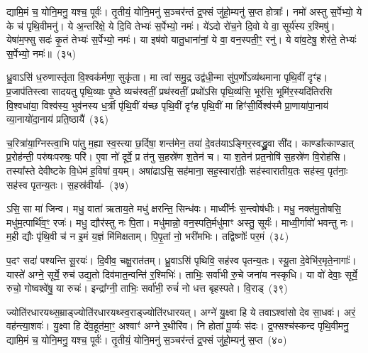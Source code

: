 द्यामि॒मं च॒ योनि॒मनु॒ यश्च॒ पूर्वः॑। तृ॒तीयं॒ योनि॒मनु॑ स॒ञ्चर॑न्तं द्र॒फ्सं जु॑हो॒म्यनु॑ स॒प्त होत्राः᳚। नमो॑ अस्तु स॒र्पेभ्यो॒ ये के च॑ पृथि॒वीमनु॑। ये अ॒न्तरि॑क्षे॒ ये दि॒वि तेभ्यः॑ स॒र्पेभ्यो॒ नमः॑। ये॑\-ऽदो रो॑च॒ने दि॒वो ये वा॒ सूर्य॑स्य र॒श्मिषु॑। येषा॑म॒फ्सु सदः॑ कृ॒तं तेभ्यः॑ स॒र्पेभ्यो॒ नमः॑। या इष॑वो यातु॒धाना॑नां॒ ये वा॒ वन॒स्पती॒ꣳ॒ रनु॑। ये वा॑व॒टेषु॒ शेर॑ते॒ तेभ्यः॑ स॒र्पेभ्यो॒ नमः॑॥~(३५)

{\anuvakamend[{म॒हो\-ऽनु॑ यातु॒धाना॑ना॒मेका॑\-दश च}]}%

ध्रु॒वाऽसि॑ ध॒रुणास्तृ॑ता वि॒श्वक॑र्मणा॒ सुकृ॑ता। मा त्वा॑ समु॒द्र उद्व॑धी॒न्मा सु॑प॒र्णो\-ऽव्य॑थमाना पृथि॒वीं दृꣳ॑ह। प्र॒जा\-प॑तिस्त्वा सादयतु पृथि॒व्याः पृ॒ष्ठे व्यच॑स्वतीं॒ प्रथ॑स्वतीं॒ प्रथो॑\-ऽसि पृथि॒व्य॑सि॒ भूर॑सि॒ भूमि॑र॒स्यदि॑तिरसि वि॒श्वधा॑या॒ विश्व॑स्य॒ भुव॑नस्य ध॒र्त्री पृ॑थि॒वीं य॑च्छ पृथि॒वीं दृꣳ॑ह पृथि॒वीं मा हिꣳ॑सी॒र्विश्व॑स्मै प्रा॒णाया॑पा॒नाय॑ व्या॒नायो॑दा॒नाय॑ प्रति॒ष्ठायै॑~(३६)

च॒रित्रा॑या॒ग्निस्त्वा॒भि पा॑तु म॒ह्या स्व॒स्त्या छ॒र्दिषा॒ शन्त॑मेन॒ तया॑ दे॒वत॑या\-ऽ\-ङ्गिर॒स्वद्ध्रु॒वा सी॑द। काण्डा᳚त्काण्डात् प्र॒रोह॑न्ती॒ परु॑षःपरुषः॒ परि॑। ए॒वा नो॑ दूर्वे॒ प्र त॑नु स॒हस्रे॑ण श॒तेन॑ च। या श॒तेन॑ प्रत॒नोषि॑ स॒हस्रे॑ण वि॒रोह॑सि। तस्या᳚स्ते देवीष्टके वि॒धेम॑ ह॒विषा॑ व॒यम्। अषा॑ढाऽसि॒ सह॑माना॒ सह॒स्वारा॑तीः॒ सह॑स्वारातीय॒तः सह॑स्व॒ पृत॑नाः॒ सह॑स्व पृतन्य॒तः। स॒हस्र॑वीर्या-~(३७)

ऽसि॒ सा मा॑ जिन्व। मधु॒ वाता॑ ऋताय॒ते मधु॑ क्षरन्ति॒ सिन्ध॑वः। माध्वी᳚र्नः स॒न्त्वोष॑धीः। मधु॒ नक्त॑मु॒तोषसि॒ मधु॑म॒त्पार्थि॑व॒ꣳ॒ रजः॑। मधु॒ द्यौर॑स्तु नः पि॒ता। मधु॑मान्नो॒ वन॒स्पति॒र्मधु॑माꣳ अस्तु॒ सूर्यः॑। माध्वी॒र्गावो॑ भवन्तु नः। म॒ही द्यौः पृ॑थि॒वी च॑ न इ॒मं य॒ज्ञं मि॑मिक्षताम्। पि॒पृ॒तां नो॒ भरी॑मभिः। तद्विष्णोः᳚ पर॒मं~(३८)

प॒दꣳ सदा॑ पश्यन्ति सू॒रयः॑। दि॒वीव॒ चक्षु॒रात॑तम्। ध्रु॒वाऽसि॑ पृथिवि॒ सह॑स्व पृतन्य॒तः। स्यू॒ता दे॒वेभि॑र॒मृते॒नागाः᳚। यास्ते॑ अग्ने॒ सूर्ये॒ रुच॑ उद्य॒तो दिव॑मात॒न्वन्ति॑ र॒श्मिभिः॑। ताभिः॒ सर्वा॑भी रु॒चे जना॑य नस्कृधि। या वो॑ देवाः॒ सूर्ये॒ रुचो॒ गोष्वश्वे॑षु॒ या रुचः॑। इन्द्रा᳚ग्नी॒ ताभिः॒ सर्वा॑भी॒ रुचं॑ नो धत्त बृहस्पते। वि॒राड्~(३९)

ज्योति॑रधारयथ्स॒म्राड्ज्योति॑रधारयथ्स्व॒राड्ज्योति॑रधारयत्। अग्ने॑ यु॒क्ष्वा हि ये तवा\-ऽ\-श्वा॑सो देव सा॒धवः॑। अरं॒ वह॑न्त्या॒शवः॑। यु॒क्ष्वा हि दे॑व॒हूत॑मा॒ꣳ॒ अश्वाꣳ॑ अग्ने र॒थीरि॑व। नि होता॑ पू॒र्व्यः स॑दः। द्र॒फ्सश्च॑स्कन्द पृथि॒वीमनु॒ द्यामि॒मं च॒ योनि॒मनु॒ यश्च॒ पूर्वः॑। तृ॒तीयं॒ योनि॒मनु॑ स॒ञ्चर॑न्तं द्र॒फ्सं जु॑हो॒म्यनु॑ स॒प्त~(४०)

